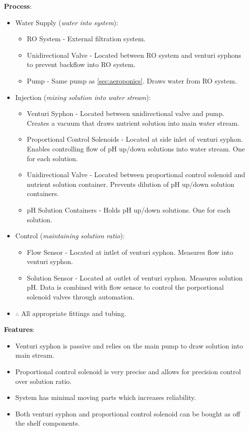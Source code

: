 \documentclass{report}
\begin{document}
\textbf{Process}:
\begin{itemize}
    \item Water Supply (\textit{water into system}):
    \begin{itemize}
        \item RO System - External filtration system. 
        \item Unidirectional Valve - Located between RO system and venturi syphons to prevent backflow into RO system.
        \item Pump - Same pump as \ref{sec:aeroponics}. Draws water from RO system.
    \end{itemize}
    \item Injection (\textit{mixing solution into water stream}):
    \begin{itemize}
        \item Venturi Syphon - Located between unidirectional valve and pump. Creates a vacuum that draws nutrient solution into main water stream.
        \item Proportional Control Solenoids - Located at side inlet of venturi syphon. Enables controlling flow of pH up/down solutions into water stream. One for each solution.
        \item Unidirectional Valve - Located between proportional control solenoid and nutrient solution container. Prevents dilution of pH up/down solution containers.
        \item pH Solution Containers - Holds pH up/down solutions. One for each solution.
    \end{itemize}
    \item Control (\textit{maintaining solution ratio}):
    \begin{itemize}
        \item Flow Sensor - Located at intlet of venturi syphon. Measures flow into venturi syphon.
        \item Solution Sensor - Located at outlet of venturi syphon. Measures solution pH. Data is combined with flow sensor to control the porportional solenoid valves through automation.
    \end{itemize}
    \item $\therefore$ All appropriate fittings and tubing.
\end{itemize}

\textbf{Features}:
\begin{itemize}
    \item Venturi syphon is passive and relies on the main pump to draw solution into main stream.
    \item Proportional control solenoid is very precise and allows for precision control over solution ratio.
    \item System has minimal moving parts which increases reliability.
    \item Both venturi syphon and proportional control solenoid can be bought as off the shelf components.
\end{itemize}
\end{document}
